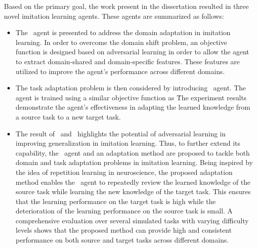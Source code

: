 Based on the primary goal,
the work present in the dissertation resulted in three novel imitation learning agents.
These agents are summarized as follows:

\begin{itemize}
  \item
        The \DAIL\ agent is presented to address the domain adaptation in imitation learning.
        In order to overcome the domain shift problem,
        an objective function is designed based on adversarial learning in order to allow the agent to extract domain-shared and domain-specific features.
        These features are utilized to improve the agent's performance across different domains.

  \item
        The task adaptation problem is then considered by introducing \TAIL\ agent.
        The agent is trained using a similar objective function as \DAIL\.
        The experiment results demonstrate the agent's effectiveness in adapting the learned knowledge from a source task to a new target task.

  \item
        The result of \DAIL\ and \TAIL\ highlights the potential of adversarial learning in improving generalization in imitation learning.
        Thus,
        to further extend its capability,
        the \DTAIL\ agent and an adaptation method are proposed to tackle both domain and task adaptation problems in imitation learning.
        Being inspired by the idea of repetition learning in neuroscience,
        the proposed adaptation method enables the \DTAIL\ agent to repeatedly review the learned knowledge of the source task while learning the new knowledge of the target task.
        This ensures that the learning performance on the target task is high while the deterioration of the learning performance on the source task is small.
        A comprehensive evaluation over several simulated tasks with varying difficulty levels shows that the proposed method can provide high and consistent performance on both source and target tasks across different domains.
\end{itemize}
